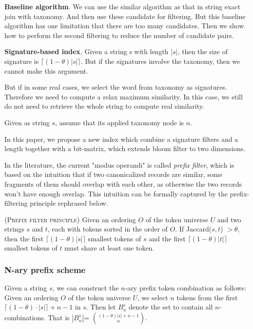 \textbf{Baseline algorithm}. We can use the similar algorithm as that in string exact join with taxonomy. And then use these candidate for filtering. But this baseline algorithm has one limitation that there are too many candidates. Then we show how to perform the second filtering to reduce the number of candidate pairs.

\textbf{Signature-based index}. Given a string s with length $|s|$, then the size of signature is $\lceil (1-\theta)|s| \rceil$. But if the signatures involve the taxonomy, then we cannot make this argument.

But if in some real cases, we select the word from taxonomy as signatures. Therefore we need to compute a relax maximum similarity. In this case, we still do not need to retrieve the whole string to compute real similarity.

Given as string $s$, assume that its applied taxonomy node is $n$.

In this paper, we propose a new index which combine a signature filters and a length together with a bit-matrix, which extends bloom filter to two dimensions.

In the literature, the current "modus operandi" is called \textit{prefix filter}, which is based on the intuition that if two canonicalized records are similar, some fragments of them should overlap with each other, as otherwise the two records
won't have enough overlap. This intuition can be formally captured by the prefix-filtering
principle \cite{conf/icde/ChaudhuriGK06} rephrased below.

\begin{lem} (\textsc{Prefix filter principle}) \cite{conf/icde/ChaudhuriGK06} Given an
ordering $O$ of the token universe $U$ and two strings $s$ and $t$, each with tokens sorted in the
order of $O$.   If Jaccard($s, t$) $> \theta$, then the first $\lceil(1-\theta)|s|\rceil$ smallest
tokens of $s$ and the first $\lceil(1-\theta)|t|\rceil$ smallest
tokens of $t$  must share at least one token.
\end{lem}

\subsubsection{N-ary prefix scheme}




Given a string $s$, we can construct the $n$-ary prefix token combination as follows:  Given an
ordering $O$ of the token universe $U$, we select $n$ tokens from the first $\lceil (1-
\theta) \cdot |s| \rceil + n -1$ in $s$. Then let $B^s_n$ denote the set to contain all $n$-combinations. That is  $|B^s_n|$= $\binom{(1-\theta)|s|+n-1}{n}$.

